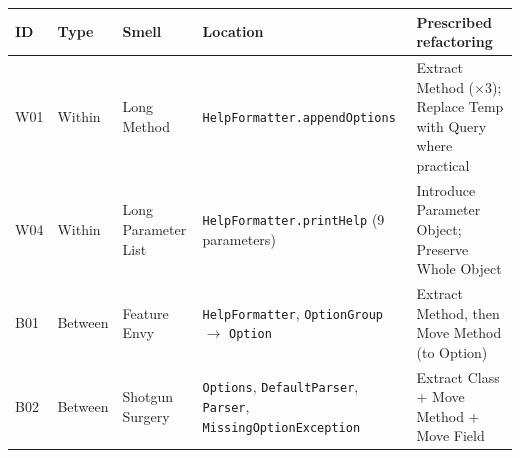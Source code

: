 \begin{tabularx}{\linewidth}{@{}l l l >{\raggedright\arraybackslash}X >{\raggedright\arraybackslash}p{5.6cm}@{}}
\toprule
ID & Type & Smell & Location & Prescribed refactoring \\
\midrule
W01 & Within & Long Method & \texttt{HelpFormatter.appendOptions} & Extract Method ($\times$3); Replace Temp with Query where practical \\
W04 & Within & Long Parameter List & \texttt{HelpFormatter.printHelp} (9 parameters) & Introduce Parameter Object; Preserve Whole Object \\
B01 & Between & Feature Envy & \texttt{HelpFormatter}, \texttt{OptionGroup} $\to$ \texttt{Option} & Extract Method, then Move Method (to Option) \\
B02 & Between & Shotgun Surgery & \texttt{Options}, \texttt{DefaultParser}, \texttt{Parser}, \texttt{MissingOptionException} & Extract Class + Move Method + Move Field \\
\bottomrule
\end{tabularx}
